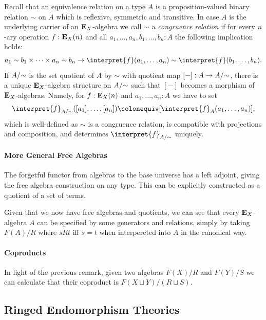 {Recall that an equivalence relation on a type \(A\) is a proposition-valued binary relation \(\sim\) on \(A\) which is reflexive, symmetric and transitive.
In case \(A\) is the underlying carrier of an \(\mathbf{E}_X\)-algebra we call \(\sim\) a \emph{congruence relation} if for every \(n\)-ary operation \(f:\mathbf{E}_X(n)\) and all \(a_1,\dots,a_n,b_1,\dots,b_n : A\) the following implication holds:
\[
  a_1 \sim b_1 \times \dots\times a_n \sim b_n \to \interpret{f}(a_1,\dots,a_n) \sim \interpret{f}(b_1,\dots,b_n).
\]
If \({A}/{\sim}\) is the set quotient of \(A\) by \(\sim\) with quotient map \([-]:A \to {A}/{\sim}\), there is a unique \(\mathbf{E}_X\)-algebra structure on \({A}/{\sim}\) such that \([-]\) becomes a morphism of \(\mathbf{E}_X\)-algebras.
Namely, for \(f:\mathbf{E}_X(n)\) and \(a_1,\dots,a_n:A\) we have to set
\[
  \interpret{f}_{\quotient{A}{\sim}}([a_1],\dots,[a_n]) \colonequiv [\interpret{f}_A(a_1,\dots,a_n)],
\]
which is well-defined as \(\sim\) is a congruence relation, is compatible with projections and composition, and determines \(\interpret{f}_{\quotient{A}{\sim}}\) uniquely.

\paragraph{More General Free Algebras}
The forgetful functor from algebras to the base universe has a left adjoint, giving the free algebra construction on any type.
This can be explicitly constructed as a quotient of a set of terms.  

Given that we now have free algebras and quotients, we can see that every \(\mathbf{E}_X\)-algebra \(A\) can be specified by some generators and relations,
simply by taking $F(A)/R$ where $sRt$ iff $s = t$ when interpereted into $A$ in the canonical way.

\paragraph{Coproducts}
In light of the previous remark, given two algebras $F(X)/R$ and $F(Y)/S$ we can calculate that their coproduct is
$F(X \sqcup Y) / (R \sqcup S)$.

\subsection{Ringed Endomorphism Theories}

}

